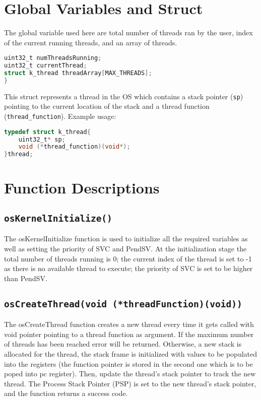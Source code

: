 \documentclass{article}
\begin{document}
\section{Global Variables and Struct}

The global variable used here are total number of threads ran by the user, index of the current running threads, and an array of threads. 

\begin{lstlisting}[language=C]
uint32_t numThreadsRunning;
uint32_t currentThread;
struct k_thread threadArray[MAX_THREADS];
}\end{lstlisting}

This struct represents a thread in the OS which contains a stack pointer (\texttt{sp}) pointing to the current location of the stack and a thread function (\texttt{thread\_function}).
Example usage: 
\begin{lstlisting}[language=C]
typedef struct k_thread{
	uint32_t* sp; 
	void (*thread_function)(void*); 
}thread;
\end{lstlisting}

\section{Function Descriptions}

\subsection{\texttt{osKernelInitialize()}}
The osKernelInitialize function is used to initialize all the required variables as well as setting the priority of SVC and PendSV. At the initialization stage the total number of threads running is 0; the current index of the thread is set to -1 as there is no available thread to execute; the priority of SVC is set to be higher than PendSV.

\subsection{\texttt{osCreateThread(void (*threadFunction)(void))}}
The osCreateThread function creates a new thread every time it gets called with void pointer pointing to a thread function as argument. If the maximum number of threads has been reached error will be returned. Otherwise, a new stack is allocated  for the thread, the stack frame is initialized with values to be populated into the registers (the function pointer is stored in the second one which is to be poped into pc register). Then, update the thread's stack pointer to track the new thread. The Process Stack Pointer (PSP) is set to the new thread's stack pointer, and the function returns a success code. 
\end{document}
